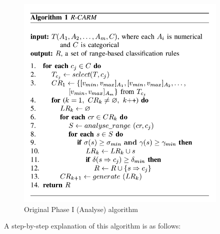 \begin{figure}[!htbp]
    \centering
    \includegraphics[width=4in]{figures/DrShaoAlgorithm1}
    \caption[Figure 2.1: Original Phase I (Analyse) algorithm]{Original Phase I (Analyse) algorithm}
    \label{fig:figure2_1}
\end{figure}

A step-by-step explanation of this algorithm is as follows: \\

